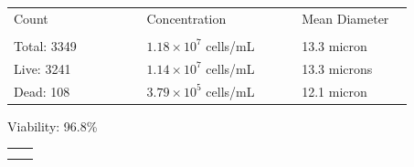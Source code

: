 \documentclass[UTF8,10pt,a4paper,fontset=fandol]{ctexart}
\newcommand{\fieldvalue}[1]{#1}
\begin{document}
\begin{tabular}{@{}p{0.30\linewidth}p{0.35\linewidth}p{0.25\linewidth}@{}}
Count & Concentration & Mean Diameter \\
\underline{\hspace{0.9in}} &
\underline{\hspace{0.9in}} &
\underline{\hspace{0.9in}} \\[0.3em]

Total:
\fieldvalue{3349}
&
\fieldvalue{$1.18 \times 10^{7}$ cells/mL}
&
\fieldvalue{13.3 micron}
\\[0.5em]

Live:
\fieldvalue{3241}
&
\fieldvalue{$1.14 \times 10^{7}$ cells/mL}
&
\fieldvalue{13.3 microns}
\\[0.5em]

Dead:
\fieldvalue{108}
&
\fieldvalue{$3.79 \times 10^{5}$ cells/mL}
&
\fieldvalue{12.1 micron}
\end{tabular}

\vspace{1em}

Viability:
\fieldvalue{96.8\%}

\vspace{1em}

\begin{center}
\begin{tabular}{cc}
\fbox{\rule{0pt}{1.7in}\rule{0.29\linewidth}{0pt}}
&
\fbox{\rule{0pt}{1.7in}\rule{0.29\linewidth}{0pt}}
\\[1.2em]
\fbox{\rule{0pt}{1.7in}\rule{0.29\linewidth}{0pt}}
&
\fbox{\rule{0pt}{1.7in}\rule{0.29\linewidth}{0pt}}
\end{tabular}
\end{center}
\end{document}
